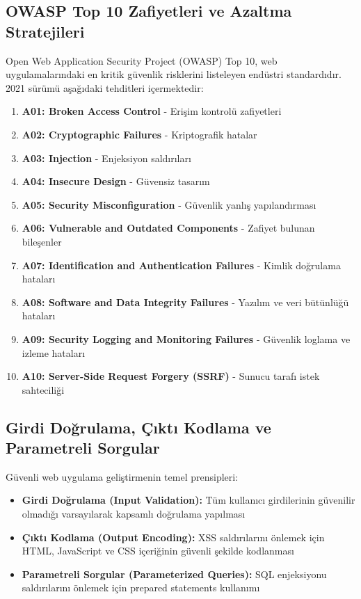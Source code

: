 \subsection{OWASP Top 10 Zafiyetleri ve Azaltma Stratejileri}

Open Web Application Security Project (OWASP) Top 10, web uygulamalarındaki en kritik güvenlik risklerini listeleyen endüstri standardıdır. 2021 sürümü aşağıdaki tehditleri içermektedir:

\begin{enumerate}
\item \textbf{A01: Broken Access Control} - Erişim kontrolü zafiyetleri
\item \textbf{A02: Cryptographic Failures} - Kriptografik hatalar  
\item \textbf{A03: Injection} - Enjeksiyon saldırıları
\item \textbf{A04: Insecure Design} - Güvensiz tasarım
\item \textbf{A05: Security Misconfiguration} - Güvenlik yanlış yapılandırması
\item \textbf{A06: Vulnerable and Outdated Components} - Zafiyet bulunan bileşenler
\item \textbf{A07: Identification and Authentication Failures} - Kimlik doğrulama hataları
\item \textbf{A08: Software and Data Integrity Failures} - Yazılım ve veri bütünlüğü hataları
\item \textbf{A09: Security Logging and Monitoring Failures} - Güvenlik loglama ve izleme hataları
\item \textbf{A10: Server-Side Request Forgery (SSRF)} - Sunucu tarafı istek sahteciliği
\end{enumerate}

\subsection{Girdi Doğrulama, Çıktı Kodlama ve Parametreli Sorgular}

Güvenli web uygulama geliştirmenin temel prensipleri:

\begin{itemize}
\item \textbf{Girdi Doğrulama (Input Validation):} Tüm kullanıcı girdilerinin güvenilir olmadığı varsayılarak kapsamlı doğrulama yapılması
\item \textbf{Çıktı Kodlama (Output Encoding):} XSS saldırılarını önlemek için HTML, JavaScript ve CSS içeriğinin güvenli şekilde kodlanması
\item \textbf{Parametreli Sorgular (Parameterized Queries):} SQL enjeksiyonu saldırılarını önlemek için prepared statements kullanımı
\end{itemize}

